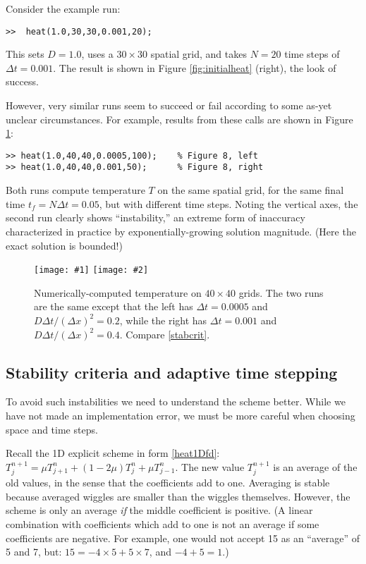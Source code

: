 \documentclass[letterpaper,final,12pt,reqno]{amsart}
\newcommand{\minput}[1]{
\vspace{0.8cm}
\VerbatimInput[frame=single,framesep=3mm,label=\fbox{\normalsize \textsl{\,#1.m\,}},fontfamily=courier,fontsize=\footnotesize]{tmp/#1.slim.m}
\vspace{0.5cm}
}
\newcommand{\twofigsizes}[5]{
\begin{figure}[ht]
\centering
\texttt{[image: \#1]} \quad
\texttt{[image: \#2]}
\caption{#3}
\label{fig:#1}
\end{figure}}
\newcommand{\twofig}[3]{\twofigsizes{#1}{#2}{#3}{2.5in}{2.5in}}
\begin{document}
Consider the example run:
\begin{Verbatim}
>>  heat(1.0,30,30,0.001,20);
\end{Verbatim}
This sets $D=1.0$, uses a $30\times 30$ spatial grid, and takes $N=20$ time steps of $\Delta t = 0.001$.  The result is shown in Figure \ref{fig:initialheat} (right), the look of success.

\minput{heat}

However, very similar runs seem to succeed or fail according to some as-yet unclear circumstances.  For example, results from these calls are shown in Figure \ref{fig:stability}:
\begin{Verbatim}
>> heat(1.0,40,40,0.0005,100);    % Figure 8, left
>> heat(1.0,40,40,0.001,50);      % Figure 8, right
\end{Verbatim}
Both runs compute temperature $T$ on the same spatial grid, for the same final time $t_f = N \Delta t = 0.05$, but with different time steps.  Noting the vertical axes, the second run clearly shows ``instability,'' an extreme form of inaccuracy characterized in practice by exponentially-growing solution magnitude.  (Here the exact solution is bounded!)

\twofig{stability}{instability}{Numerically-computed temperature on $40\times 40$ grids.  The two runs are the same except that the left has $\Delta t=0.0005$ and $D\Delta t/(\Delta x)^2= 0.2$, while the right has $\Delta t=0.001$ and $D\Delta t/(\Delta x)^2= 0.4$.  Compare \eqref{stabcrit}.}

\subsection*{Stability criteria and adaptive time stepping}  To avoid such instabilities we need to understand the scheme better.  While we have not made an implementation error, we must be more careful when choosing space and time steps.

Recall the 1D explicit scheme in form \eqref{heat1Dfd}: $T_j^{n+1} = \mu T_{j+1}^n + (1 - 2 \mu) T_j^n + \mu T_{j-1}^n$.  The new value $T_j^{n+1}$ is an average of the old values, in the sense that the coefficients add to one.  Averaging is stable because averaged wiggles are smaller than the wiggles themselves.  However, the scheme is only an average \emph{if} the middle coefficient is positive.  (A linear combination with coefficients which add to one is not an average if some coefficients are negative.  For example, one would not accept 15 as an ``average'' of 5 and 7, but: $15 = -4 \times 5 + 5 \times 7$, and $-4+5=1$.)
\end{document}
